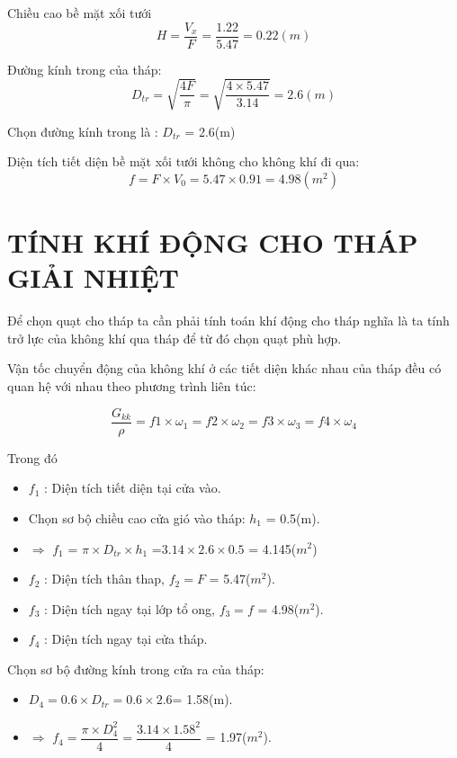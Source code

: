 Chiều cao bề mặt xối tưới
\begin{equation*}
	H = \dfrac{V_{x}}{F}=\dfrac{1.22}{5.47} =0.22(m)
\end{equation*}

Đường kính trong của tháp:
\begin{equation*}
	D_{tr} = \sqrt{\dfrac{4F}{\pi}} = \sqrt{\dfrac{4 \times 5.47}{3.14}} =2.6(m)
\end{equation*}

Chọn đường kính trong là : $D_{tr}$ = 2.6(m)

Diện tích tiết diện bề mặt xối tưới không cho không khí đi qua:
\begin{equation*}
	f = F \times V_{0} = 5.47 \times 0.91 = 4.98(m^2)
\end{equation*}

\newpage
\section{TÍNH KHÍ ĐỘNG CHO THÁP GIẢI NHIỆT}
Để chọn quạt cho tháp ta cần phải tính toán khí động cho tháp nghĩa là ta tính trở lực của không khí qua tháp để từ đó chọn quạt phù hợp.

Vận tốc chuyển động của không khí ở các tiết diện khác nhau của tháp đều có quan hệ với nhau theo phương trình liên túc:

\begin{equation}
	\dfrac{G_{kk}}{\rho} = f1 \times \omega_{1} = f2 \times \omega_{2} = f3 \times \omega_{3} =f4 \times \omega_{4} 
\end{equation}

Trong đó
\begin{itemize}
	\item $f_{1}$ : Diện tích tiết diện tại cửa vào.
	\item Chọn sơ bộ chiều cao cửa gió vào tháp: $h_{1}$ = 0.5(m).
	\item $\Rightarrow$ $f_{1}$ = $\pi \times D_{tr} \times h_{1}$ =$3.14 \times 2.6 \times 0.5$ = 4.145($m^2$)
	\item $f_{2}$ : Diện tích thân thap, $f_{2} = F$ = 5.47($m^2$).
	\item $f_{3}$ : Diện tích ngay tại lớp tổ ong, $f_{3} = f$ = 4.98($m^2$).
	\item $f_{4}$ : Diện tích ngay tại cửa tháp.
\end{itemize}

Chọn sơ bộ đường kính trong cửa ra của tháp:
\begin{itemize}
	\item $D_{4} = 0.6 \times D_{tr} = 0.6 \times 2.6 $= 1.58(m).
	\item $\Rightarrow$ $f_{4} = \dfrac{\pi \times D_{4}^{2}}{4} = \dfrac{3.14 \times 1.58^2}{4}$ = 1.97($m^2$).
\end{itemize}

